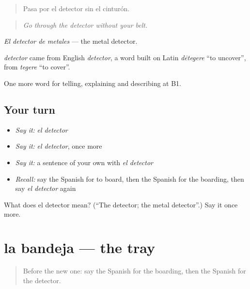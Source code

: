 \begin{quote}
Pasa por el detector sin el cinturón.
\end{quote}

\begin{quote}
\emph{Go through the detector without your belt.}
\end{quote}

\emph{El detector de metales} — the metal detector.

\begin{cousinweb}
\emph{detector} came from English \emph{detector}, a word built on Latin \emph{dētegere} \textquotedblleft{}to uncover\textquotedblright{}, from \emph{tegere} \textquotedblleft{}to cover\textquotedblright{}.
\end{cousinweb}

\begin{grammarlens}[title={What you've built}]
One more word for telling, explaining and describing at B1.
\end{grammarlens}

\subsection*{Your turn}
\begin{itemize}
\raggedright
  \item \emph{Say it:} \emph{el detector}
  \item \emph{Say it:} \emph{el detector}, once more
  \item \emph{Say it:} a sentence of your own with \emph{el detector}
  \item \emph{Recall:} say the Spanish for to board, then the Spanish for the boarding, then say \emph{el detector} again
\end{itemize}

\begin{tcolorbox}[breakable,colback=teal!4,colframe=teal!35!black,title={Before you move on}]
What does el detector mean? (\textquotedblleft{}The detector; the metal detector\textquotedblright{}.) Say it once more.
\end{tcolorbox}
\section[la bandeja]{la bandeja — the tray}

\label{lesson:ES-C653-bandeja}



\begin{quote}
Before the new one: say the Spanish for the boarding, then the Spanish for the detector.
\end{quote}

